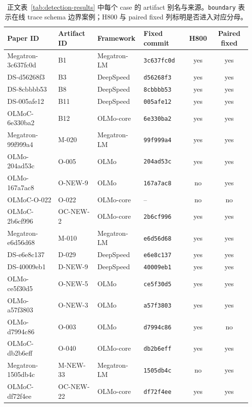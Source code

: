 \begin{table}[t]
\centering
\caption{正文表~\ref{tab:detection-results} 中每个 case 的 artifact 别名与来源。\texttt{boundary} 表示在线 trace schema 边界案例；H800 与 paired fixed 列标明是否进入对应分母。}
\label{tab:table6-provenance}
\small
\setlength{\tabcolsep}{4pt}
\begin{tabular}{@{}l l l l c c@{}}
\toprule
\textbf{Paper ID} & \textbf{Artifact ID} & \textbf{Framework} & \textbf{Fixed commit} & \textbf{H800} & \textbf{Paired fixed} \\
\midrule
Megatron-3c637fc0d & B1 & Megatron-LM & \texttt{3c637fc0d} & yes & yes \\
DS-d56268f3 & B3 & DeepSpeed & \texttt{d56268f3} & yes & yes \\
DS-8cbbbb53 & B8 & DeepSpeed & \texttt{8cbbbb53} & yes & yes \\
DS-005afe12 & B11 & DeepSpeed & \texttt{005afe12} & yes & yes \\
OLMoC-6e330ba2 & B12 & OLMo-core & \texttt{6e330ba2} & yes & yes \\
Megatron-99f999a4 & M-020 & Megatron-LM & \texttt{99f999a4} & yes & yes \\
OLMo-204ad53c & O-005 & OLMo & \texttt{204ad53c} & yes & yes \\
OLMo-167a7ac8 & O-NEW-9 & OLMo & \texttt{167a7ac8} & no & yes \\
OLMoC-O-022 & O-022 & OLMo-core & -- & no & no \\
OLMoC-2b6cf996 & OC-NEW-2 & OLMo-core & \texttt{2b6cf996} & yes & yes \\
Megatron-e6d56d68 & M-010 & Megatron-LM & \texttt{e6d56d68} & yes & yes \\
DS-e6e8c137 & D-029 & DeepSpeed & \texttt{e6e8c137} & yes & yes \\
DS-40009eb1 & D-NEW-9 & DeepSpeed & \texttt{40009eb1} & yes & yes \\
OLMo-ce5f30d5 & O-NEW-5 & OLMo & \texttt{ce5f30d5} & yes & yes \\
OLMo-a57f3803 & O-NEW-3 & OLMo & \texttt{a57f3803} & yes & yes \\
OLMo-d7994c86 & O-003 & OLMo & \texttt{d7994c86} & yes & no \\
OLMoC-db2b6eff & O-040 & OLMo-core & \texttt{db2b6eff} & yes & yes \\
Megatron-1505db4c & M-NEW-33 & Megatron-LM & \texttt{1505db4c} & no & yes \\
OLMoC-df72f4ee & OC-NEW-22 & OLMo-core & \texttt{df72f4ee} & yes & yes \\
\bottomrule
\end{tabular}
\end{table}
